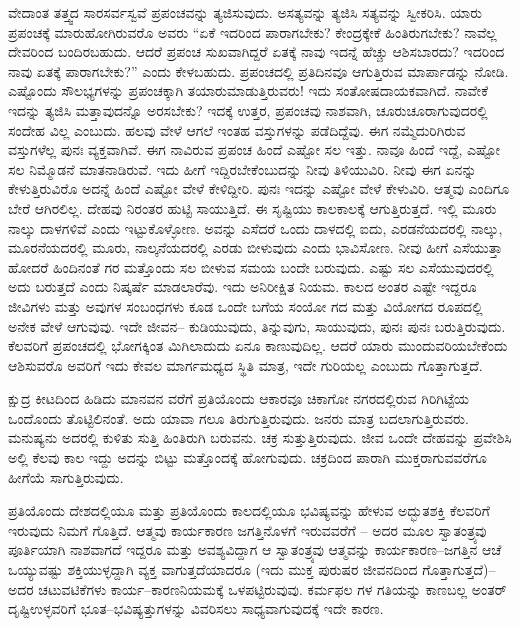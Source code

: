 ವೇದಾಂತ ತತ್ತ್ವದ ಸಾರಸರ್ವಸ್ವವೆ ಪ್ರಪಂಚವನ್ನು ತ್ಯಜಿಸುವುದು. ಅಸತ್ಯವನ್ನು ತ್ಯಜಿಸಿ ಸತ್ಯವನ್ನು ಸ್ವೀಕರಿಸಿ. ಯಾರು ಪ್ರಪಂಚಕ್ಕೆ ಮಾರುಹೋಗಿರುವರೊ ಅವರು “ಏಕೆ ಇದರಿಂದ ಪಾರಾಗಬೇಕು? ಕೇಂದ್ರಕ್ಕೇಕೆ ಹಿಂತಿರುಗಬೇಕು? ನಾವೆಲ್ಲ ದೇವರಿಂದ ಬಂದಿರಬಹುದು. ಆದರೆ ಪ್ರಪಂಚ ಸುಖವಾಗಿದ್ದರೆ ಏತಕ್ಕೆ ನಾವು ಇದನ್ನೆ ಹೆಚ್ಚು ಆಶಿಸಬಾರದು? ಇದರಿಂದ ನಾವು ಏತಕ್ಕೆ ಪಾರಾಗಬೇಕು?” ಎಂದು ಕೇಳಬಹುದು. ಪ್ರಪಂಚದಲ್ಲಿ ಪ್ರತಿದಿನವೂ ಆಗುತ್ತಿರುವ ಮಾರ್ಪಾಡನ್ನು ನೋಡಿ. ಎಷ್ಟೊಂದು ಸೌಲಭ್ಯಗಳನ್ನು ಪ್ರಪಂಚಕ್ಕಾಗಿ ತಯಾರುಮಾಡುತ್ತಿರುವರು! ಇದು ಸಂತೋಷದಾಯಕವಾಗಿದೆ. ನಾವೇಕೆ ಇದನ್ನು ತ್ಯಜಿಸಿ ಮತ್ತಾವುದನ್ನೊ ಅರಸಬೇಕು? ಇದಕ್ಕೆ ಉತ್ತರ, ಪ್ರಪಂಚವು ನಾಶವಾಗಿ, ಚೂರುಚೂರಾಗುವುದರಲ್ಲಿ ಸಂದೇಹ ವಿಲ್ಲ ಎಂಬುದು. ಹಲವು ವೇಳೆ ಆಗಲೆ ಇಂತಹ ವಸ್ತುಗಳನ್ನು ಪಡೆದಿದ್ದೆವು. ಈಗ ನಮ್ಮೆದುರಿಗಿರುವ ವಸ್ತುಗಳೆಲ್ಲ ಪುನಃ ವ್ಯಕ್ತವಾಗಿವೆ. ಈಗ ನಾವಿರುವ ಪ್ರಪಂಚ ಹಿಂದೆ ಎಷ್ಟೋ ಸಲ ಇತ್ತು. ನಾವೂ ಹಿಂದೆ ಇದ್ದೆ, ಎಷ್ಟೋ ಸಲ ನಿಮ್ಮೊಡನೆ ಮಾತನಾಡಿರುವೆ. ಇದು ಹೀಗೆ ಇದ್ದಿರಬೇಕೆಂಬುದನ್ನು ನೀವು ತಿಳಿಯುವಿರಿ. ನೀವು ಈಗ ಏನನ್ನು ಕೇಳುತ್ತಿರುವಿರೊ ಅದನ್ನೆ ಹಿಂದೆ ಎಷ್ಟೋ ವೇಳೆ ಕೇಳಿದ್ದೀರಿ. ಪುನಃ ಇದನ್ನು ಎಷ್ಟೋ ವೇಳೆ ಕೇಳುವಿರಿ. ಆತ್ಮವು ಎಂದಿಗೂ ಬೇರೆ ಆಗಿರಲಿಲ್ಲ. ದೇಹವು ನಿರಂತರ ಹುಟ್ಟಿ ಸಾಯುತ್ತಿದೆ. ಈ ಸೃಷ್ಟಿಯು ಕಾಲಕಾಲಕ್ಕೆ ಆಗುತ್ತಿರುತ್ತದೆ. ಇಲ್ಲಿ ಮೂರು ನಾಲ್ಕು ದಾಳಗಳಿವೆ ಎಂದು ಇಟ್ಟುಕೊಳ್ಳೋಣ. ಅವನ್ನು ಎಸೆದರೆ ಒಂದು ದಾಳದಲ್ಲಿ ಐದು, ಎರಡನೆಯದರಲ್ಲಿ ನಾಲ್ಕು, ಮೂರನೆಯದರಲ್ಲಿ ಮೂರು, ನಾಲ್ಕನೆಯದರಲ್ಲಿ ಎರಡು ಬೀಳುವುದು ಎಂದು ಭಾವಿಸೋಣ. ನೀವು ಹೀಗೆ ಎಸೆಯುತ್ತಾ ಹೋದರೆ ಹಿಂದಿನಂತೆ ಗರ ಮತ್ತೊಂದು ಸಲ ಬೀಳುವ ಸಮಯ ಬಂದೇ ಬರುವುದು. ಎಷ್ಟು ಸಲ ಎಸೆಯುವುದರಲ್ಲಿ ಅದು ಬರುತ್ತದೆ ಎಂದು ನಿಷ್ಕರ್ಷೆ ಮಾಡಲಾರೆವು. ಇದು ಅನಿರೀಕ್ಷಿತ ನಿಯಮ. ಕಾಲದ ಅಂತರ ಎಷ್ಟೇ ಇದ್ದರೂ ಜೀವಿಗಳು ಮತ್ತು ಅವುಗಳ ಸಂಬಂಧಗಳು ಕೂಡ ಒಂದೇ ಬಗೆಯ ಸಂಯೋ ಗದ ಮತ್ತು ವಿಯೋಗದ ರೂಪದಲ್ಲಿ ಅನೇಕ ವೇಳೆ ಆಗುವುವು. ಇದೇ ಜೀವನ– ಕುಡಿಯುವುದು, ತಿನ್ನುವುಗು, ಸಾಯುವುದು, ಪುನಃ ಪುನಃ ಬರುತ್ತಿರುವುದು. ಕೆಲವರಿಗೆ ಪ್ರಪಂಚದಲ್ಲಿ ಭೋಗಕ್ಕಿಂತ ಮಿಗಿಲಾದುದು ಏನೂ ಕಾಣುವುದಿಲ್ಲ. ಆದರೆ ಯಾರು ಮುಂದುವರಿಯಬೇಕೆಂದು ಆಶಿಸುವರೊ ಅವರಿಗೆ ಇದು ಕೇವಲ ಮಾರ್ಗಮಧ್ಯದ ಸ್ಥಿತಿ ಮಾತ್ರ, ಇದೇ ಗುರಿಯಲ್ಲ ಎಂಬುದು ಗೊತ್ತಾಗುತ್ತದೆ.

ಕ್ಷುದ್ರ ಕೀಟದಿಂದ ಹಿಡಿದು ಮಾನವನ ವರೆಗೆ ಪ್ರತಿಯೊಂದು ಆಕಾರವೂ ಚಿಕಾಗೋ ನಗರದಲ್ಲಿರುವ ಗಿರಿಗಿಟ್ಟೆಯ ಒಂದೊಂದು ತೊಟ್ಟಿಲಿನಂತೆ. ಅದು ಯಾವಾ ಗಲೂ ತಿರುಗುತ್ತಿರುವುದು. ಜನರು ಮಾತ್ರ ಬದಲಾಗುತ್ತಿರುವರು. ಮನುಷ್ಯನು ಅದರಲ್ಲಿ ಕುಳಿತು ಸುತ್ತಿ ಹಿಂತಿರುಗಿ ಬರುವನು. ಚಕ್ರ ಸುತ್ತುತ್ತಿರುವುದು. ಜೀವ ಒಂದೇ ದೇಹವನ್ನು ಪ್ರವೇಶಿಸಿ ಅಲ್ಲಿ ಕೆಲವು ಕಾಲ ಇದ್ದು ಅದನ್ನು ಬಿಟ್ಟು ಮತ್ತೊಂದಕ್ಕೆ ಹೋಗುವುದು. ಚಕ್ರದಿಂದ ಪಾರಾಗಿ ಮುಕ್ತರಾಗುವವರೆಗೂ ಹೀಗೆಯೆ ಸಾಗುತ್ತಿರುವುದು.

ಪ್ರತಿಯೊಂದು ದೇಶದಲ್ಲಿಯೂ ಮತ್ತು ಪ್ರತಿಯೊಂದು ಕಾಲದಲ್ಲಿಯೂ ಭವಿಷ್ಯವನ್ನು ಹೇಳುವ ಅದ್ಭುತಶಕ್ತಿ ಕೆಲವರಿಗೆ ಇರುವುದು ನಿಮಗೆ ಗೊತ್ತಿದೆ. ಆತ್ಮವು ಕಾರ್ಯಕಾರಣ ಜಗತ್ತಿನೊಳಗೆ ಇರುವವರೆಗೆ – ಅದರ ಮೂಲ ಸ್ವಾತಂತ್ರ್ಯವು ಪೂರ್ತಿಯಾಗಿ ನಾಶವಾಗದೆ ಇದ್ದರೂ ಮತ್ತು ಅವಶ್ಯವಿದ್ದಾಗ ಆ ಸ್ವಾತಂತ್ರ್ಯವು ಆತ್ಮವನ್ನು ಕಾರ್ಯಕಾರಣ–ಜಗತ್ತಿನ ಆಚೆ ಒಯ್ಯುವಷ್ಟು ಶಕ್ತಿಯುಳ್ಳದ್ದಾಗಿ ವ್ಯಕ್ತ ವಾಗುತ್ತದೆಯಾದರೂ (ಇದು ಮುಕ್ತ ಪುರುಷರ ಜೀವನದಿಂದ ಗೊತ್ತಾಗುತ್ತದೆ)– ಅದರ ಚಟುವಟಿಕೆಗಳು ಕಾರ್ಯ–ಕಾರಣನಿಯಮಕ್ಕೆ ಒಳಪಟ್ಟಿರುವುವು. ಕರ್ಮಫಲ ಗಳ ಗತಿಯನ್ನು ಕಾಣಬಲ್ಲ ಅಂತರ್​ದೃಷ್ಟಿಉಳ್ಳವರಿಗೆ ಭೂತ–ಭವಿಷ್ಯತ್ತುಗಳನ್ನು ವಿವರಿಸಲು ಸಾಧ್ಯವಾಗುವುದಕ್ಕೆ ಇದೇ ಕಾರಣ.

